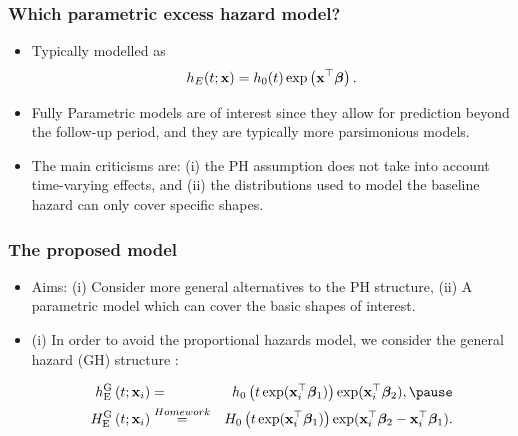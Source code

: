 \documentclass[10pt,handout,compress]{beamer}
\newcommand{\bbeta}{\bm{\beta}}
\newcommand{\bx}{{\bf x}}
\begin{document}
\begin{frame}
\frametitle{Which parametric excess hazard model?}
\begin{itemize}
\item Typically modelled as
$$h_E(t;\bx) = h_0(t)\exp\left(\bx^{\top}\bbeta\right).$$ 
%

\pause

\item Fully Parametric models are of interest since they allow for prediction beyond the follow-up period, and they are typically more parsimonious models. 
\pause
\item The main criticisms are: (i) the PH assumption does not take into account time-varying effects, and (ii) the distributions used to model the baseline hazard can only cover specific shapes.
\end{itemize}
\end{frame}


\begin{frame}
\frametitle{The proposed model}
\begin{itemize}
\item Aims: (i) Consider more general alternatives to the PH structure, (ii) A parametric model which can cover the basic shapes of interest. \citep{R18}  \pause

\item (i) In order to avoid the proportional hazards model, we consider the general hazard (GH) structure \citep{C01}:

\begin{eqnarray}\label{GH}
h_{\text{E}}^{\text{G}}\left(t;\bx_i\right) &=& h_0\left(t \exp(\bx_i^{\top}\bbeta_1)\right)\exp(\bx_i^{\top}\bbeta_2), \pause \\
H_{\text{E}}^{\text{G}}\left(t;\bx_i\right) &\stackrel{Homework}{=}& H_0\left(t \exp(\bx_i^{\top}\bbeta_1)\right)\exp(\bx_i^{\top}\bbeta_2 - \bx_i^{\top}\bbeta_1).
\end{eqnarray}
\end{itemize}
\end{frame}
\end{document}
